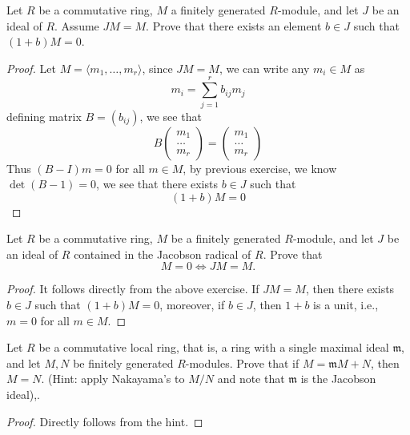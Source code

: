 \documentclass[openany]{book}
\newcommand{\la}{\langle}
\newcommand{\ra}{\rangle}
\begin{document}
\begin{prob}[3.7]
    Let \( R \) be a commutative ring, \( M \) a finitely generated \( R \)-module, and let \( J \) be an ideal of \( R \). Assume \( JM = M \). Prove that there exists an element \( b \in J \) such that \((1 + b)M = 0\). 
\end{prob}
\begin{proof}
    Let $M=\la m_1,\dots, m_r\ra$, since $JM=M$, we can write any $m_i\in M$ as 
    \begin{equation*}
        m_i=\sum_{j=1}^rb_{ij}m_j
    \end{equation*}
    defining matrix $B=(b_{ij})$, we see that 
    \begin{equation*}
        B\begin{pmatrix}
            m_1\\
            \dots\\
            m_r
        \end{pmatrix}=\begin{pmatrix}
            m_1\\
            \dots\\
            m_r
        \end{pmatrix}
    \end{equation*}
    Thus $(B-I)m=0$ for all $m\in M$, by previous exercise, we know $\det(B-1)=0$, we see that there exists $b\in J$ such that 
    \begin{equation*}
        (1+b)M=0
    \end{equation*}
\end{proof}





\begin{prob}[3.8]
    Let \( R \) be a commutative ring, \( M \) be a finitely generated \( R \)-module, and let \( J \) be an ideal of \( R \) contained in the Jacobson radical of \( R \). Prove that 
\[
M = 0 \iff JM = M.
\] 
\end{prob}
\begin{proof}
    It follows directly from the above exercise. If $JM=M$, then there exists $b\in J$ such that $(1+b)M=0$, moreover, if $b\in J$, then $1+b$ is a unit, i.e., $m=0$ for all $m\in M$.
\end{proof}



\begin{prob}[3.9]
    Let \( R \) be a commutative local ring, that is, a ring with a single maximal ideal \( \mathfrak{m} \), and let \( M, N \) be finitely generated \( R \)-modules. Prove that if \( M = \mathfrak{m}M + N \), then \( M = N \). (Hint: apply Nakayama's to $M/N$ and note that $\mathfrak{m}$ is the Jacobson ideal),.
\end{prob}
\begin{proof}
    Directly follows from the hint.
\end{proof}
\end{document}

